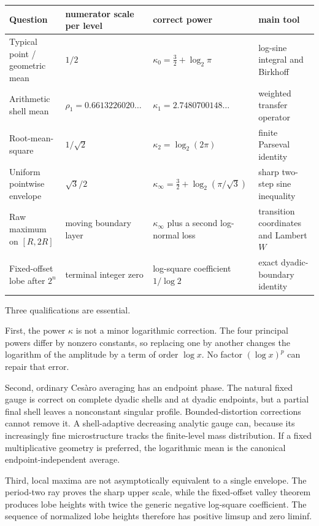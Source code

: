 \documentclass[11pt,oneside]{article}
\numberwithin{equation}{section}
\theoremstyle{definition}
\theoremstyle{remark}
\begin{document}
\begin{center}
\small
\begin{tabularx}{\textwidth}{@{}p{}p{}p{}X@{}}
\toprule
Question & numerator scale per level & correct power & main tool\\
\midrule
Typical point / geometric mean
 & \(1/2\)
 & \(\kappa_0=\frac32+\log_2\pi\)
 & log-sine integral and Birkhoff\\[0.3em]
Arithmetic shell mean
 & \(\rho_1=0.6613226020\ldots\)
 & \(\kappa_1=2.7480700148\ldots\)
 & weighted transfer operator\\[0.3em]
Root-mean-square
 & \(1/\sqrt2\)
 & \(\kappa_2=\log_2(2\pi)\)
 & finite Parseval identity\\[0.3em]
Uniform pointwise envelope
 & \(\sqrt3/2\)
 & \(\kappa_\infty=\frac32+\log_2(\pi/\sqrt3)\)
 & sharp two-step sine inequality\\[0.3em]
Raw maximum on \([R,2R]\)
 & moving boundary layer
 & \(\kappa_\infty\) plus a second log-normal loss
 & transition coordinates and Lambert \(W\)\\[0.3em]
Fixed-offset lobe after \(2^n\)
 & terminal integer zero
 & log-square coefficient \(1/\log2\)
 & exact dyadic-boundary identity\\
\bottomrule
\end{tabularx}
\end{center}

Three qualifications are essential.

First, the power \(\kappa\) is not a minor logarithmic correction.  The four principal
powers differ by nonzero constants, so replacing one by another changes the logarithm of the
amplitude by a term of order \(\log x\).  No factor \((\log x)^p\) can repair that error.

Second, ordinary Ces\`aro averaging has an endpoint phase.  The natural fixed gauge is
correct on complete dyadic shells and at dyadic endpoints, but a partial final shell leaves a
nonconstant singular profile.  Bounded-distortion corrections cannot remove it.  A
shell-adaptive decreasing analytic gauge can, because its increasingly fine microstructure
tracks the finite-level mass distribution.  If a fixed multiplicative geometry is preferred,
the logarithmic mean is the canonical endpoint-independent average.

Third, local maxima are not asymptotically equivalent to a single envelope.  The period-two
ray proves the sharp upper scale, while the fixed-offset valley theorem produces lobe heights
with twice the generic negative log-square coefficient.  The sequence of normalized lobe
heights therefore has positive limsup and zero liminf.
\end{document}
